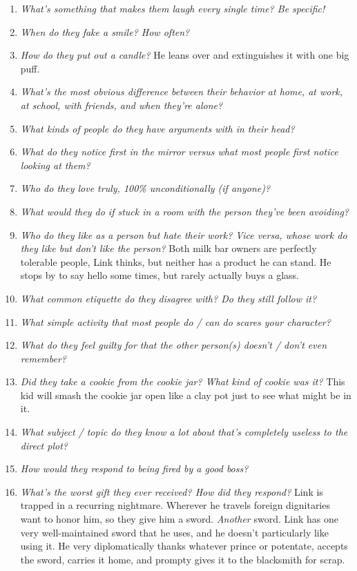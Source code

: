 \begin{enumerate}
    \item\textit{What’s something that makes them laugh every single time? Be specific!}
    \item\textit{When do they fake a smile? How often?}
    \item\textit{How do they put out a candle?} He leans over and extinguishes it with one big puff. 
    \item\textit{What’s the most obvious difference between their behavior at home, at work, at school, with friends, and when they’re alone?} 
    \item\textit{What kinds of people do they have arguments with in their head?}
    \item\textit{What do they notice first in the mirror versus what most people first notice looking at them?} 
    \item\textit{Who do they love truly, 100\% unconditionally (if anyone)?} 
    \item\textit{What would they do if stuck in a room with the person they’ve been avoiding?}
    \item\textit{Who do they like as a person but hate their work? Vice versa, whose work do they like but don’t like the person?} Both milk bar owners are perfectly tolerable people, Link thinks, but neither has a product he can stand. He stops by to say hello some times, but rarely actually buys a glass.
    \item\textit{What common etiquette do they disagree with? Do they still follow it?} 
    \item\textit{What simple activity that most people do / can do scares your character?}
    \item\textit{What do they feel guilty for that the other person(s) doesn’t / don’t even remember?}
    \item\textit{Did they take a cookie from the cookie jar? What kind of cookie was it?} This kid will smash the cookie jar open like a clay pot just to see what might be in it.
    \item\textit{What subject / topic do they know a lot about that’s completely useless to the direct plot?}
    \item\textit{How would they respond to being fired by a good boss?}
    \item\textit{What’s the worst gift they ever received? How did they respond?} Link is trapped in a recurring nightmare. Wherever he travels foreign dignitaries want to honor him, so they give him a sword. \emph{Another} sword. Link has one very well-maintained sword that he uses, and he doesn't particularly like using it. He very diplomatically thanks whatever prince or potentate, accepts the sword, carries it home, and prompty gives it to the blacksmith for scrap.

\end{enumerate}
